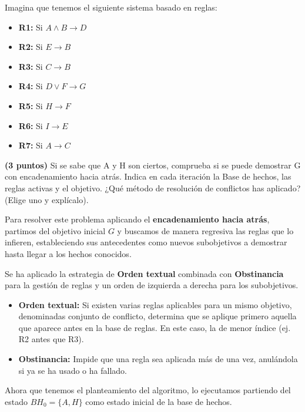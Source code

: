 \documentclass[11pt, a4paper]{article}
\newenvironment{problem}[1][Cuestión]{
	\vspace{0.5cm}
	\noindent{\Large\bfseries #1} \par\vspace{0.5cm}
}{
	\vspace{0.5cm}
}
\begin{document}
	\begin{problem}[Cuestión 3 (30 \%)]
		Imagina que tenemos el siguiente sistema basado en reglas:

		\begin{itemize}
			\item \textbf{R1:} Si $A \wedge B \rightarrow D$
			\item \textbf{R2:} Si $E \rightarrow B$
			\item \textbf{R3:} Si $C \rightarrow B$
			\item \textbf{R4:} Si $D \vee F \rightarrow G$
			\item \textbf{R5:} Si $H \rightarrow F$
			\item \textbf{R6:} Si $I \rightarrow E$
			\item \textbf{R7:} Si $A \rightarrow C$
		\end{itemize}

		\textbf{(3 puntos)} Si se sabe que A y H son ciertos, comprueba si se puede demostrar G con encadenamiento hacia atrás. Indica en cada iteración la Base de hechos, las reglas activas y el objetivo. ¿Qué método de resolución de conflictos has aplicado? (Elige uno y explícalo).

		{ \color{blue} 
			Para resolver este problema aplicando el \textbf{encadenamiento hacia atrás}, partimos del objetivo inicial $G$ y buscamos de manera regresiva las reglas que lo infieren, estableciendo sus antecedentes como nuevos subobjetivos a demostrar hasta llegar a los hechos conocidos.

			Se ha aplicado la estrategia de \textbf{Orden textual} combinada con \textbf{Obstinancia} para la gestión de reglas y un orden de izquierda a derecha para los subobjetivos.

			\begin{itemize}
				\item \textbf{Orden textual:} Si existen varias reglas aplicables para un mismo objetivo, denominadas conjunto de conflicto, determina que se aplique primero aquella que aparece antes en la base de reglas. En este caso, la de menor índice (ej. R2 antes que R3).
				\item \textbf{Obstinancia:} Impide que una regla sea aplicada más de una vez, anulándola si ya se ha usado o ha fallado.
			\end{itemize}

			Ahora que tenemos el planteamiento del algoritmo, lo ejecutamos partiendo del estado $BH_0 = \{A, H\}$ como estado inicial de la base de hechos.

}
\end{problem}
\end{document}
